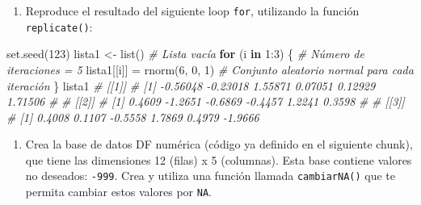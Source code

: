 \documentclass[
]{article}
\newenvironment{Shaded}{\begin{snugshade}}{\end{snugshade}}
\newcommand{\CommentTok}[1]{\textcolor[rgb]{0.56,0.35,0.01}{\textit{#1}}}
\newcommand{\ControlFlowTok}[1]{\textcolor[rgb]{0.13,0.29,0.53}{\textbf{#1}}}
\newcommand{\DecValTok}[1]{\textcolor[rgb]{0.00,0.00,0.81}{#1}}
\newcommand{\FunctionTok}[1]{\textcolor[rgb]{0.00,0.00,0.00}{#1}}
\newcommand{\NormalTok}[1]{#1}
\newcommand{\OtherTok}[1]{\textcolor[rgb]{0.56,0.35,0.01}{#1}}
\newcommand{\SpecialCharTok}[1]{\textcolor[rgb]{0.00,0.00,0.00}{#1}}
\providecommand{\tightlist}{%
  \setlength{\itemsep}{0pt}\setlength{\parskip}{0pt}}
\theoremstyle{definition}
\theoremstyle{definition}
\theoremstyle{definition}
\theoremstyle{definition}
\theoremstyle{remark}
\begin{document}
\begin{enumerate}
\def\labelenumi{\arabic{enumi}.}
\tightlist
\item
  Reproduce el resultado del siguiente loop \texttt{for}, utilizando la función \texttt{replicate()}:
\end{enumerate}

\begin{Shaded}
\begin{Highlighting}[]
\FunctionTok{set.seed}\NormalTok{(}\DecValTok{123}\NormalTok{)}
\NormalTok{lista1 }\OtherTok{\textless{}{-}} \FunctionTok{list}\NormalTok{() }\CommentTok{\# Lista vacía}
\ControlFlowTok{for}\NormalTok{ (i }\ControlFlowTok{in} \DecValTok{1}\SpecialCharTok{:}\DecValTok{3}\NormalTok{) \{ }\CommentTok{\# Número de iteraciones = 5}
\NormalTok{  lista1[[i]] }\OtherTok{=} \FunctionTok{rnorm}\NormalTok{(}\DecValTok{6}\NormalTok{, }\DecValTok{0}\NormalTok{, }\DecValTok{1}\NormalTok{) }\CommentTok{\# Conjunto aleatorio normal para cada iteración}
\NormalTok{\}}
\NormalTok{lista1}
\CommentTok{\# [[1]]}
\CommentTok{\# [1] {-}0.56048 {-}0.23018  1.55871  0.07051  0.12929  1.71506}
\CommentTok{\# }
\CommentTok{\# [[2]]}
\CommentTok{\# [1]  0.4609 {-}1.2651 {-}0.6869 {-}0.4457  1.2241  0.3598}
\CommentTok{\# }
\CommentTok{\# [[3]]}
\CommentTok{\# [1]  0.4008  0.1107 {-}0.5558  1.7869  0.4979 {-}1.9666}
\end{Highlighting}
\end{Shaded}

\begin{enumerate}
\def\labelenumi{\arabic{enumi}.}
\tightlist
\item
  Crea la base de datos DF numérica (código ya definido en el siguiente chunk), que tiene las dimensiones 12 (filas) x 5 (columnas). Esta base contiene valores no deseados: \texttt{-999}. Crea y utiliza una función llamada \texttt{cambiarNA()} que te permita cambiar estos valores por \texttt{NA}.
\end{enumerate}
\end{document}
